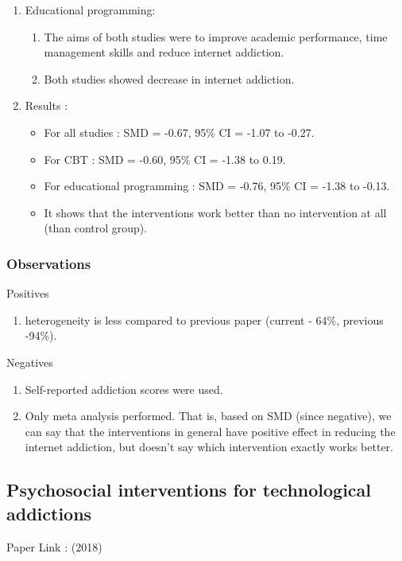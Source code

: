 \documentclass{article}
\begin{document}
\begin{enumerate}
\begin{enumerate}
        \begin{enumerate}
            \item Study 1: Showed reduction in time spent on internet.
        \end{enumerate}
        \item Educational programming:
        \begin{enumerate}
            \item The aims of both studies were to improve academic performance, time management skills and reduce internet addiction.
            \item Both studies showed decrease in internet addiction.
        \end{enumerate}
        \item Results : 
        \begin{itemize}
            \item For all studies : SMD = -0.67, 95\% CI = -1.07 to -0.27. 
            \item For CBT : SMD = -0.60, 95\% CI = -1.38 to 0.19.
            \item For educational programming : SMD = -0.76, 95\% CI = -1.38 to -0.13.
            \item It shows that the interventions work better than no intervention at all (than control group).
        \end{itemize}
    \end{enumerate}
\end{enumerate}
\subsubsection{Observations}
Positives
\begin{enumerate}
    \item heterogeneity is less compared to previous paper (current - 64\%, previous -94\%).
\end{enumerate}
Negatives
\begin{enumerate}
    \item Self-reported addiction scores were used.
    \item Only meta analysis performed. That is, based on SMD (since negative), we can say that the interventions in general have positive effect in reducing the internet addiction, but doesn't say which intervention exactly works better. 
\end{enumerate}

\subsection{Psychosocial interventions for technological addictions}
Paper Link : \cite{sharma2018psychosocial} (2018)
\end{document}
